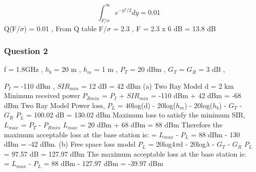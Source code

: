 \documentclass[12pt]{article}
\begin{document}
\begin{equation*}
	\int_{F/\sigma}^{\infty} e^{-y^2/2}dy = 0.01
\end{equation*}
Q(F/\(\sigma\)) = 0.01 ,  
From Q table F/\(\sigma\) = 2.3 , 
F = 2.3 x 6 dB = 13.8 dB
\newpage
\subsubsection*{Question 2}
\vspace{5mm}
f = 1.8GHz , \(h_b\) = 20 m , \(h_m\) = 1 m , \(P_T\) = 20 dBm , \(G_T\) = \(G_R\) = 3 dB , 

\(P_I\) = -110 dBm , \(SIR_{min}\) = 12 dB = 42 dBm
\newline
\newline
(a) Two Ray Model
\newline
\newline
d = 2 km
\newline
Minimum received power \newline
\(P_{Rmin}\) =  \(P_I\) + \(SIR_{min}\) 
			= -110 dBm + 42 dBm 
			= -68 dBm
\newline
\newline
Two Ray Model Power loss,\newline
\(P_L\) = 40log(d) - 20log(\(h_m\)) - 20log(\(h_b\)) - \(G_T\) - \(G_R\) \newline
\(P_L\) = 100.02 dB = 130.02 dBm
\newline
\newline
Maximum loss to satisfy the minimum SIR, \(L_{max}\) = 	\(P_T\)  - 	\(P_{Rmin}\)
\newline
\(L_{max}\) = 20 dBm + 68 dBm = 88 dBm
\newline
\newline
Therefore the maximum acceptable loss at the base station is: 
= \(L_{max}\) - \(P_L\)			  
= 88 dBm - 130 dBm
= -42 dBm.
\newline	
\newline
\newline
(b) Free space loss model
\newline
\newline
\(P_L\) = 20log4\(\pi\)d - 20log\(\lambda\) - \(G_T\) - \(G_R\) 
\newline
\(P_L\) = 97.57 dB = 127.97 dBm
\newline
\newline
The maximum acceptable loss at the base station is:
= \(L_{max}\) - \(P_L\)			  
= 88 dBm - 127.97 dBm
= -39.97 dBm
								   
\end{document}
